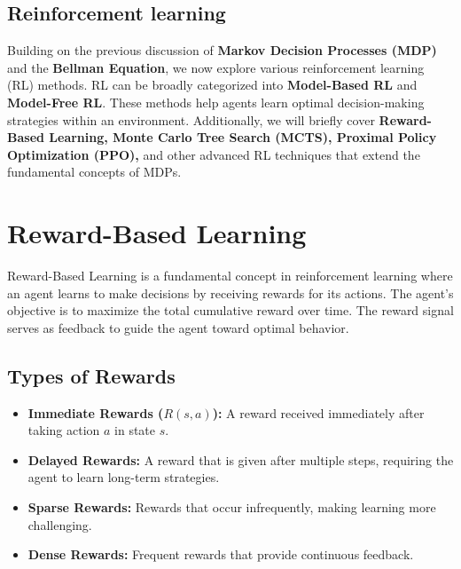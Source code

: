 \documentclass[
]{book}
\providecommand{\tightlist}{%
  \setlength{\itemsep}{0pt}\setlength{\parskip}{0pt}}
\begin{document}
\section{\texorpdfstring{\textbf{Reinforcement learning}}{Reinforcement learning}}\label{reinforcement-learning}

Building on the previous discussion of \textbf{Markov Decision Processes (MDP)} and the \textbf{Bellman Equation}, we now explore various reinforcement learning (RL) methods. RL can be broadly categorized into \textbf{Model-Based RL} and \textbf{Model-Free RL}. These methods help agents learn optimal decision-making strategies within an environment. Additionally, we will briefly cover \textbf{Reward-Based Learning, Monte Carlo Tree Search (MCTS), Proximal Policy Optimization (PPO),} and other advanced RL techniques that extend the fundamental concepts of MDPs.

\chapter{\texorpdfstring{\textbf{Reward-Based Learning}}{Reward-Based Learning}}\label{reward-based-learning}

Reward-Based Learning is a fundamental concept in reinforcement learning where an agent learns to make decisions by receiving rewards for its actions. The agent's objective is to maximize the total cumulative reward over time. The reward signal serves as feedback to guide the agent toward optimal behavior.

\section{\texorpdfstring{\textbf{Types of Rewards}}{Types of Rewards}}\label{types-of-rewards}

\begin{itemize}
\tightlist
\item
  \textbf{Immediate Rewards (\(R(s, a)\)):} A reward received immediately after taking action \(a\) in state \(s\).
\item
  \textbf{Delayed Rewards:} A reward that is given after multiple steps, requiring the agent to learn long-term strategies.
\item
  \textbf{Sparse Rewards:} Rewards that occur infrequently, making learning more challenging.
\item
  \textbf{Dense Rewards:} Frequent rewards that provide continuous feedback.
\end{itemize}
\end{document}
